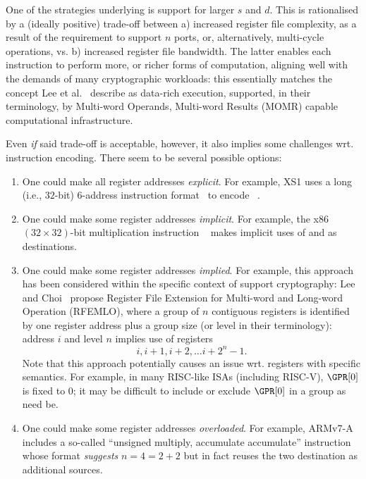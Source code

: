 \begin{itemize}
      One of the strategies underlying \XCID is support for larger $s$ and
      $d$.  This is rationalised by a (ideally positive) trade-off between
      a) increased register file complexity, as a result of the requirement
         to support $n$ ports, or, alternatively, multi-cycle operations,
         vs.
      b) increased register file bandwidth.
      The latter enables each instruction to perform more, or richer forms 
      of computation, aligning well with the demands of many cryptographic 
      workloads: this essentially matches the concept
      Lee et al.~\cite{SCARV:LeeYanShi:04}
      describe as data-rich execution, supported, in their terminology, by 
      Multi-word Operands, Multi-word Results (MOMR)
      capable computational infrastructure.

      Even {\em if} said trade-off is acceptable, however, it also implies 
      some challenges wrt. instruction encoding.  There seem to be several 
      possible options:

      \begin{enumerate}
      \item One could make all  register addresses {\em explicit}.
            For example, XS1 uses a long (i.e., $32$-bit) $6$-address 
            instruction format~\cite[Page 246]{SCARV:XS1:09} 
            to encode
            ~\cite[Page 146]{SCARV:XS1:09}.
      \item One could make some register addresses {\em implicit}.  
            For example, the x86 $( 32 \times 32 )$-bit multiplication 
            instruction 
            ~\cite[Page 4-144--4-145]{SCARV:X86:2:18} 
            makes implicit uses of  and  as destinations.
      \item One could make some register addresses {\em implied}.
            For example, this approach has been considered within the
            specific context of support cryptography: 
            Lee and Choi~\cite{SCARV:LeeCho:08} propose Register File
            Extension for Multi-word and Long-word Operation (RFEMLO), 
            where a group of $n$ contiguous registers is identified by 
            one register address plus a group size (or level in their terminology): 
            address $i$ and level $n$ implies use of registers
            \[
            i, i + 1, i + 2, \ldots i + 2^n - 1 .
            \]
            Note that this approach potentially causes an issue wrt.
            registers with specific semantics.  For example, in many
            RISC-like ISAs (including RISC-V), $\GPR[0]$ is fixed to 
            $0$; it may be difficult to include or exclude $\GPR[0]$ 
            in a group as need be.
      \item One could make some register addresses {\em overloaded}.
            For example, ARMv7-A includes a so-called ``unsigned multiply,
            accumulate accumulate'' instruction 
            ~\cite[Section A8.8.255]{SCARV:ARMv7_M:17} 
            whose format {\em suggests} $n = 4 = 2 + 2$ but in fact 
            reuses the two destination as additional sources.
      \end{enumerate}
      

\end{itemize}
